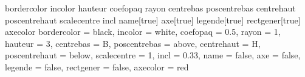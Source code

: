 
 {bordercolor}{}
 {incolor}{}
 {hauteur}{}
 {coefopaq}{}
 {rayon}{}
 {centrebas}{}
 {poscentrebas}{}
 {centrehaut}{}
 {poscentrehaut}{}
 {scalecentre}{}
 {incl}{}
 {name}[true]{}
 {axe}[true]{}
 {legende}[true]{}
 {rectgener}[true]{}
 {axecolor}{}
 {bordercolor = black,
 							 incolor = white,
 							 coefopaq = 0.5,
 							 rayon = 1,
 							 hauteur = 3,
 							 centrebas = B,
 							 poscentrebas = above,
 							 centrehaut = H,
 							 poscentrehaut = below,
 							 scalecentre = 1,
 							 incl = 0.33,
 							 name = false,
 							 axe = false,
 							 legende = false,
							 rectgener = false,
 							 axecolor = red}{}

\newcommand*{\cylindre}[1][]{\pasCylindre[#1]}

